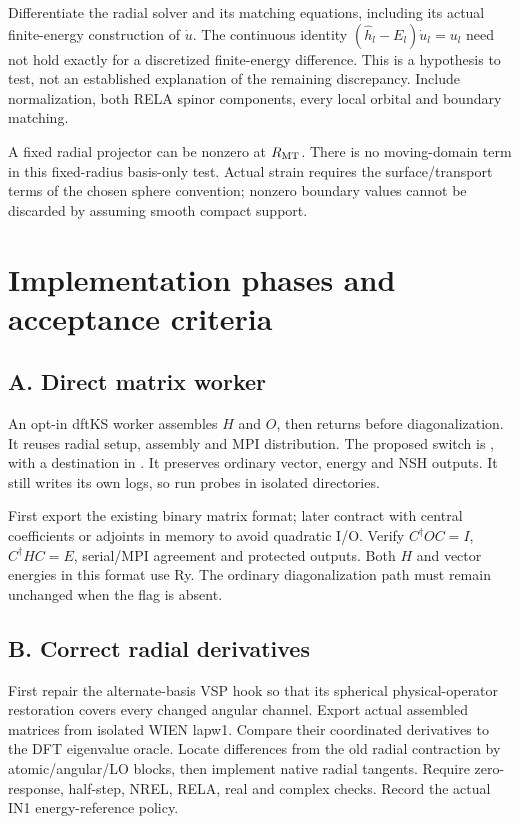 \documentclass[11pt]{article}
\begin{document}
Differentiate the radial solver and its matching equations, including its actual finite-energy construction of $\dot u$. The continuous identity $(\hat h_l-E_l)\dot u_l=u_l$ need not hold exactly for a discretized finite-energy difference. This is a hypothesis to test, not an established explanation of the remaining discrepancy. Include normalization, both RELA spinor components, every local orbital and boundary matching.

A fixed radial projector can be nonzero at $R_{\rm MT}$. There is no moving-domain term in this fixed-radius basis-only test. Actual strain requires the surface/transport terms of the chosen sphere convention; nonzero boundary values cannot be discarded by assuming smooth compact support.

\section{Implementation phases and acceptance criteria}
\subsection*{A. Direct matrix worker}
An opt-in dftKS worker assembles $H$ and $O$, then returns before diagonalization. It reuses radial setup, assembly and MPI distribution. The proposed switch is , with a destination in . It preserves ordinary vector, energy and NSH outputs. It still writes its own logs, so run probes in isolated directories.

First export the existing binary matrix format; later contract with central coefficients or adjoints in memory to avoid quadratic I/O. Verify $C^\dagger OC=I$, $C^\dagger HC=E$, serial/MPI agreement and protected outputs. Both $H$ and vector energies in this format use Ry. The ordinary diagonalization path must remain unchanged when the flag is absent.

\subsection*{B. Correct radial derivatives}
First repair the alternate-basis VSP hook so that its spherical physical-operator restoration covers every changed angular channel. Export actual assembled matrices from isolated WIEN lapw1. Compare their coordinated derivatives to the DFT eigenvalue oracle. Locate differences from the old radial contraction by atomic/angular/LO blocks, then implement native radial tangents. Require zero-response, half-step, NREL, RELA, real and complex checks. Record the actual IN1 energy-reference policy.
\end{document}
